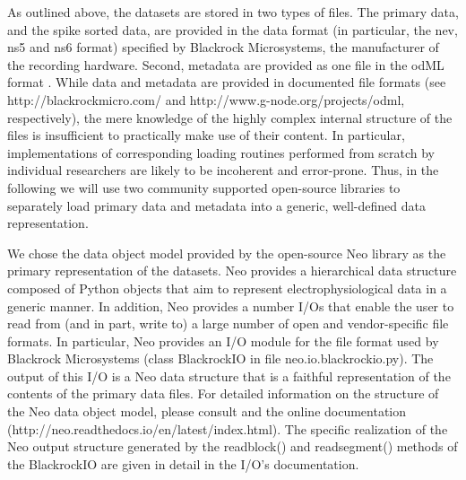 {As outlined above, the datasets are stored in two types of files. The primary data, and the spike sorted data, are provided in the data format (in particular, the nev, ns5 and ns6 format) specified by Blackrock Microsystems, the manufacturer of the recording hardware. Second, metadata are provided as one file in the odML format \cite{Grewe_2011}. While data and metadata are provided in documented file formats (see http://blackrockmicro.com/ and http://www.g-node.org/projects/odml, respectively), the mere knowledge of the highly complex internal structure of the files is insufficient to practically make use of their content. In particular, implementations of corresponding loading routines performed from scratch by individual researchers are likely to be incoherent and error-prone. Thus, in the following we will use two community supported open-source libraries to separately load primary data and metadata into a generic, well-defined data representation. 

We chose the data object model provided by the open-source Neo library \cite{Garcia_2014} as the primary representation of the datasets. Neo provides a hierarchical data structure composed of Python objects that aim to represent electrophysiological data in a generic manner. In addition, Neo provides a number I/Os that enable the user to read from (and in part, write to) a large number of open and vendor-specific file formats. In particular, Neo provides an I/O module for the file format used by Blackrock Microsystems (class BlackrockIO in file neo.io.blackrockio.py). The output of this I/O is a Neo data structure that is a faithful representation of the contents of the primary data files. For detailed information on the structure of the Neo data object model, please consult \cite{Garcia_2014} and the online documentation (http://neo.readthedocs.io/en/latest/index.html). The specific realization of the Neo output structure generated by the readblock() and readsegment() methods of the BlackrockIO are given in detail in the I/O's documentation. 

}
